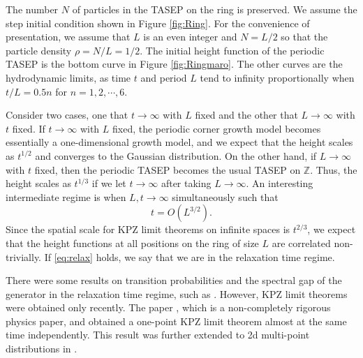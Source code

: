 \documentclass[10pt]{article}
\theoremstyle{plain}
\theoremstyle{definition}
\newcommand{\beq}{ \begin{equation} }
\newcommand{\eeq}{ \end{equation} }
\newcommand{\Z}{\mathbb{Z}}
\numberwithin{equation}{section}
\begin{document}
The number $N$ of particles in the TASEP on the ring is preserved. 
We assume the step initial condition shown in Figure \ref{fig:Ring}. 
For the convenience of presentation, we assume that $L$ is an even integer and $N=L/2$ so that the particle density $\rho=N/L=1/2$. 
The initial height function of the periodic TASEP is the bottom curve in Figure \ref{fig:Ringmaro}. 
The other curves are the hydrodynamic limits, as time $t$ and period $L$ tend to infinity proportionally when $t/L=0.5n$ for $n=1,2, \cdots, 6$. 

Consider two cases, one that $t\to\infty$ with $L$ fixed and the other that $L\to\infty$ with $t$ fixed. 
If $t\to\infty$ with $L$ fixed, the periodic corner growth model becomes essentially a one-dimensional growth model, and we expect that the height scales as $t^{1/2}$ and converges to the Gaussian distribution. 
On the other hand, if $L\to \infty$ with $t$ fixed, then the periodic TASEP becomes the usual TASEP on $\Z$. 
Thus, the height scales as $t^{1/3}$ if we let $t\to\infty$ after taking $L\to \infty$. 
An interesting intermediate regime is when $L, t\to\infty$ simultaneously such that 
\beq \label{eq:relax}
	t=O(L^{3/2}). 
\eeq
Since the spatial scale for KPZ limit theorems on infinite spaces is $t^{2/3}$, we expect that the height functions at all positions on the ring of size $L$ are correlated non-trivially. 
If \eqref{eq:relax} holds, we say that we are in the relaxation time regime. 


There were some results on transition probabilities and the spectral gap of the generator in the relaxation time regime, such  as \cite{Gwa-SpohnBethe}.  
However, KPZ limit theorems %
were obtained only recently. 
The paper \cite{Prolhac16}, which is a non-completely rigorous physics paper, and \cite{Baik-Liu18} obtained a one-point KPZ limit theorem almost at the same time independently. 
This result was further extended to 2d multi-point distributions in \cite{Baik-Liu19, Baik-Liu21}. 
\end{document}
